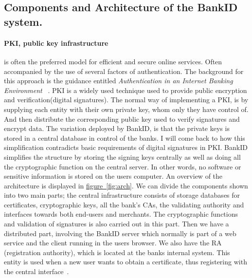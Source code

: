 \documentclass[a4paper,11pt]{article}
\begin{document}
\subsection{Components and Architecture of the BankID system.}
\paragraph{PKI, public key infrastructure} is often the preferred model for efficient and secure online services. Often accompanied by the use of several factors of authentication. The background for this approach is the guidance entitled \emph{Authentication in an Internet Banking Environment} ~\cite{auth-banking}. PKI is a widely used technique used to provide public encryption and verification(digital signatures). The normal way of implementing a PKI, is by supplying each entity with their own private key, whom only they have control of. And then distribute the corresponding public key used to verify signatures and encrypt data. The variation deployed by BankID, is that the private keys is stored in a central database in control of the banks. I will come back to how this simplification contradicts basic requirements of digital signatures in PKI. BankID simplifies the structure by storing the signing keys centrally as well as doing all the cryptographic function on the central server. In other words, no software or sensitive information is stored on the users computer. An overview of the architecture is displayed in \hyperref[fig:Alice]{figure~\ref*{fig:arch}}. We can divide the components shown into two main parts; the central infrastructure consists of storage databases for certificates, cryptographic keys, all the bank's CAs, the validating authority and interfaces towards both end-users and merchants. The cryptographic functions and validation of signatures is also carried out in this part. Then we have a distributed part, involving the BankID server which normally is part of a web service and the client running in the users browser. We also have the RA (registration authority), which is located at the banks internal system. This entity is used when a new user wants to obtain a certificate, thus registering with the central interface~\cite{bankid}.
\end{document}
